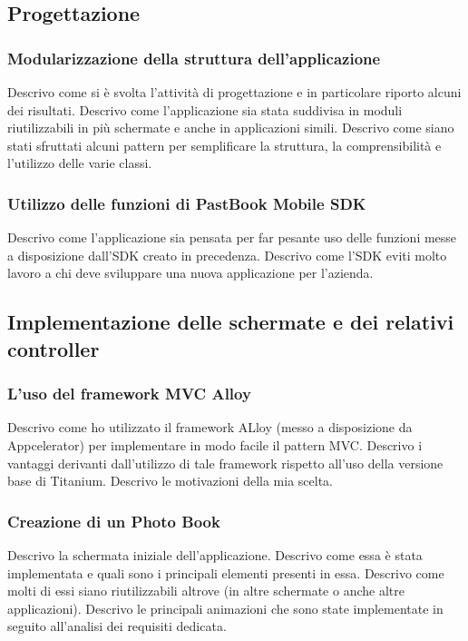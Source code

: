 		\subsection{Progettazione}
			\subsubsection{Modularizzazione della struttura dell'applicazione}
				Descrivo come si è svolta l'attività di progettazione e in particolare riporto alcuni dei risultati. Descrivo come
				l'applicazione sia stata suddivisa in moduli riutilizzabili in più schermate e anche in applicazioni simili. 
				Descrivo come siano stati sfruttati alcuni pattern per semplificare la struttura, la comprensibilità e l'utilizzo
				delle varie classi.
			\subsubsection{Utilizzo delle funzioni di PastBook Mobile SDK}
				Descrivo come l'applicazione sia pensata per far pesante uso delle funzioni messe a disposizione dall'SDK creato in
				precedenza. Descrivo come l'SDK eviti molto lavoro a chi deve sviluppare una nuova applicazione per l'azienda.
		\subsection{Implementazione delle schermate e dei relativi controller}
			\subsubsection{L'uso del framework MVC Alloy}
				Descrivo come ho utilizzato il framework ALloy (messo a disposizione da Appcelerator) per implementare in modo
				facile il pattern MVC. Descrivo i vantaggi derivanti dall'utilizzo di tale framework rispetto all'uso della versione
				base di Titanium. Descrivo le motivazioni della mia scelta.
			\subsubsection{Creazione di un Photo Book}
				Descrivo la schermata iniziale dell'applicazione. Descrivo come essa è stata implementata e quali sono i principali
				elementi presenti in essa. Descrivo come molti di essi siano riutilizzabili altrove (in altre schermate o anche
				altre applicazioni). Descrivo le principali animazioni che sono state implementate in seguito all'analisi dei
				requisiti dedicata.

